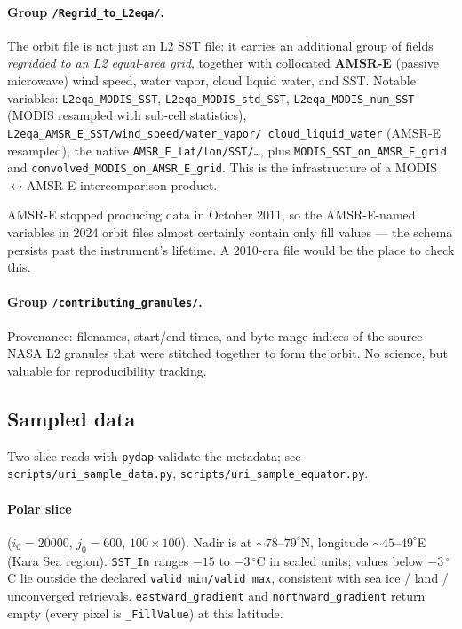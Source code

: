 \documentclass[11pt]{article}
\begin{document}
\paragraph{Group \texttt{/Regrid\_to\_L2eqa/}.} The orbit file is not
just an L2 SST file: it carries an additional group of fields
\emph{regridded to an L2 equal-area grid}, together with collocated
\textbf{AMSR-E} (passive microwave) wind speed, water vapor, cloud
liquid water, and SST. Notable variables:
\texttt{L2eqa\_MODIS\_SST}, \texttt{L2eqa\_MODIS\_std\_SST},
\texttt{L2eqa\_MODIS\_num\_SST} (MODIS resampled with sub-cell
statistics), \texttt{L2eqa\_AMSR\_E\_SST/wind\_speed/water\_vapor/
cloud\_liquid\_water} (AMSR-E resampled), the native
\texttt{AMSR\_E\_lat/lon/SST/\dots}, plus
\texttt{MODIS\_SST\_on\_AMSR\_E\_grid} and
\texttt{convolved\_MODIS\_on\_AMSR\_E\_grid}. This is the
infrastructure of a MODIS$\leftrightarrow$AMSR-E intercomparison
product.

AMSR-E stopped producing data in October 2011, so the AMSR-E-named
variables in 2024 orbit files almost certainly contain only fill
values --- the schema persists past the instrument's lifetime. A
2010-era file would be the place to check this.

\paragraph{Group \texttt{/contributing\_granules/}.} Provenance:
filenames, start/end times, and byte-range indices of the source
NASA L2 granules that were stitched together to form the orbit. No
science, but valuable for reproducibility tracking.

\subsection{Sampled data}

Two slice reads with \texttt{pydap} validate the metadata; see
\texttt{scripts/uri\_sample\_data.py},
\texttt{scripts/uri\_sample\_equator.py}.

\paragraph{Polar slice} ($i_0=20000$, $j_0=600$, $100\times 100$).
Nadir is at $\sim 78\text{--}79^\circ$N, longitude
$\sim 45\text{--}49^\circ$E (Kara Sea region). \texttt{SST\_In}
ranges $-15$ to $-3\,^\circ$C in scaled units; values below
$-3\,^\circ$C lie outside the declared \texttt{valid\_min/valid\_max},
consistent with sea ice / land / unconverged retrievals.
\texttt{eastward\_gradient} and \texttt{northward\_gradient} return
empty (every pixel is \texttt{\_FillValue}) at this latitude.
\end{document}
